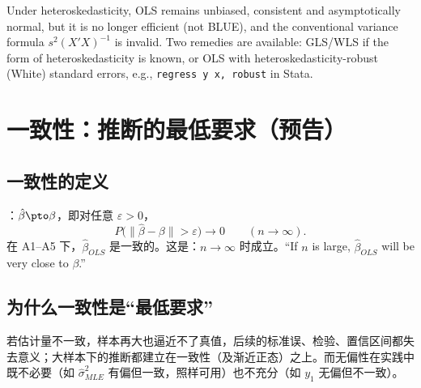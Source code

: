 \begin{english}
Under heteroskedasticity, OLS remains unbiased, consistent and asymptotically normal, but it is no longer efficient (not BLUE), and the conventional variance formula $s^2(X'X)^{-1}$ is invalid. Two remedies are available: GLS/WLS if the form of heteroskedasticity is known, or OLS with heteroskedasticity-robust (White) standard errors, e.g., \texttt{regress y x, robust} in Stata.
\end{english}

\section{一致性：推断的最低要求（预告）}\label{sec:U04-consist}

\subsection{一致性的定义}

：$\hat\beta\pto\beta$，即对任意 $\varepsilon>0$，
\[
P\big(\|\hat\beta-\beta\|>\varepsilon\big)\to0\qquad(n\to\infty).
\]
在 A1--A5 下，$\hat\beta_{OLS}$ 是一致的。这是：$n\to\infty$ 时成立。“If $n$ is large, $\hat\beta_{OLS}$ will be very close to $\beta$.”

\begin{center}
\end{center}

\subsection{为什么一致性是“最低要求”}

\begin{keypt}
若估计量不一致，样本再大也逼近不了真值，后续的标准误、检验、置信区间都失去意义；大样本下的推断都建立在一致性（及渐近正态）之上。而无偏性在实践中既不必要（如 $\hat\sigma^2_{MLE}$ 有偏但一致，照样可用）也不充分（如 $y_1$ 无偏但不一致）。
\end{keypt}

